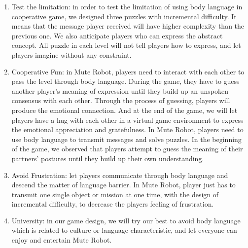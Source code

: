 \documentclass{sigchi}
\begin{document}
\begin{enumerate}
\item Test the limitation: in order to test the limitation of using body language in cooperative game, we designed three puzzles with incremental difficulty. It means that the message player received will have higher complexity than the previous one.
We also anticipate players who can express the abstract concept. All puzzle in each level will not tell players how to express, and let players imagine without any constraint.
\item Cooperative Fun: 
in Mute Robot, players need to interact with each other to pass the level through body language. During the game, they have to guess another player's meaning of expression until they build up an unspoken consensus with each other. Through the process of guessing, players will produce the emotional connection. And at the end of the game, we will let players have a hug with each other in a virtual game environment to express the emotional appreciation and gratefulness.
In Mute Robot, players need to use body language to transmit messages and solve puzzles. In the beginning of the game, we observed that players attempt to guess the meaning of their partners’ postures until they build up their own understanding. 
\item Avoid Frustration: 
let players communicate through body language and descend the matter of language barrier. In Mute Robot, player just has to transmit one single object or mission at one time, with the design of incremental difficulty, to decrease the players feeling of frustration.
\item University: 
in our game design, we will try our best to avoid body language which is related to culture or language characteristic, and let everyone can enjoy and entertain Mute Robot.
\end{enumerate}
\end{document}
